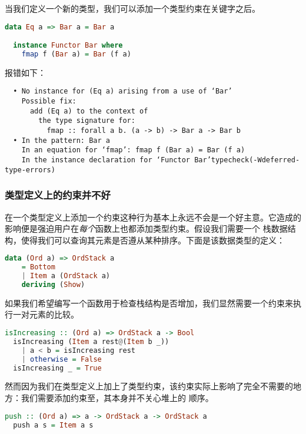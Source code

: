 \documentclass[./main.tex]{subfiles}
\begin{document}
当我们定义一个新的类型，我们可以添加一个类型约束在关键字之后。

\begin{lstlisting}[language=Haskell]
  data Eq a => Bar a = Bar a

  instance Functor Bar where
    fmap f (Bar a) = Bar (f a)
\end{lstlisting}

报错如下：

\begin{lstlisting}
  • No instance for (Eq a) arising from a use of ‘Bar’
    Possible fix:
      add (Eq a) to the context of
        the type signature for:
          fmap :: forall a b. (a -> b) -> Bar a -> Bar b
  • In the pattern: Bar a
    In an equation for ‘fmap’: fmap f (Bar a) = Bar (f a)
    In the instance declaration for ‘Functor Bar’typecheck(-Wdeferred-type-errors)
\end{lstlisting}

\subsubsection*{类型定义上的约束并不好}

在一个类型定义上添加一个约束这种行为基本上永远不会是一个好主意。它造成的影响便是强迫用户在\textit{每个}函数上也都添加类型约束。假设我们需要一个
栈数据结构，使得我们可以查询其元素是否遵从某种排序。下面是该数据类型的定义：

\begin{lstlisting}[language=Haskell]
  data (Ord a) => OrdStack a
    = Bottom
    | Item a (OrdStack a)
    deriving (Show)
\end{lstlisting}

如果我们希望编写一个函数用于检查栈结构是否增加，我们显然需要一个约束来执行一对元素的比较。

\begin{lstlisting}[language=Haskell]
  isIncreasing :: (Ord a) => OrdStack a -> Bool
  isIncreasing (Item a rest@(Item b _))
    | a < b = isIncreasing rest
    | otherwise = False
  isIncreasing _ = True
\end{lstlisting}

然而因为我们在类型定义上加上了类型约束，该约束实际上影响了完全不需要的地方：我们需要添加约束至，其本身并不关心堆上的
顺序。

\begin{lstlisting}[language=Haskell]
  push :: (Ord a) => a -> OrdStack a -> OrdStack a
  push a s = Item a s
\end{lstlisting}
\end{document}
